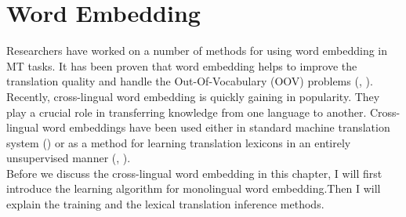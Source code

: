 \chapter{Word Embedding}
Researchers have worked on a number of methods for using word embedding in MT tasks. It has been proven that word embedding helps to improve the translation quality and handle the Out-Of-Vocabulary (OOV) problems (\cite{neishi2017bag}, \cite{qi2018and}). Recently, cross-lingual word embedding is quickly gaining in popularity. They play a crucial role in transferring knowledge from one language to another. Cross-lingual word embeddings have been used either in standard machine translation system (\cite{lample2017unsupervised}) or as a method for learning translation lexicons in an entirely unsupervised manner (\cite{xing2015normalized}, \cite{lample2018phrase}). \\
Before we discuss the cross-lingual word embedding in this chapter, I will first introduce the learning algorithm for monolingual word embedding.Then I will explain the training and the lexical translation inference methods.

